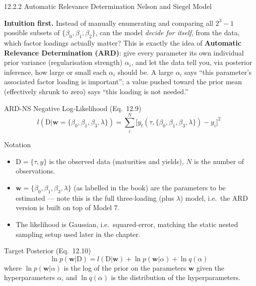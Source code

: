 \documentclass[aspectratio=169,10pt]{beamer}
\newcommand{\bw}{\mathbf{w}}
\newcommand{\D}{\mathrm{D}}
\begin{document}
\begin{frame}[allowframebreaks]{12.2.2 Automatic Relevance Determination Nelson and Siegel Model}

\textbf{Intuition first.} Instead of manually enumerating and comparing all $2^3-1$ possible subsets of $\{\beta_0,\beta_1,\beta_2\}$, can the model \emph{decide for itself}, from the data, which factor loadings actually matter? This is exactly the idea of \textbf{Automatic Relevance Determination (ARD)}: give every parameter its own individual prior variance (regularisation strength) $\alpha_i$, and let the data tell you, via posterior inference, how large or small each $\alpha_i$ should be. A large $\alpha_i$ says ``this parameter's associated factor loading is important''; a value pushed toward the prior mean (effectively shrunk to zero) says ``this loading is not needed.''

\begin{block}{ARD-NS Negative Log-Likelihood (Eq.~12.9)}
\[
  l(\D|\bw=\{\beta_0,\beta_1,\beta_3,\lambda\}) = \sum_{i}^{N}\big[y_t(\tau,\{\beta_0,\beta_1,\beta_3,\lambda\}) - y_i\big]^2
\]
\end{block}

\begin{block}{Notation}
\begin{itemize}
  \item $\D=\{\tau,y\}$ is the observed data (maturities and yields), $N$ is the number of observations.
  \item $\bw = \{\beta_0,\beta_1,\beta_3,\lambda\}$ (as labelled in the book) are the parameters to be estimated --- note this is the full three-loading (plus $\lambda$) model, i.e.\ the ARD version is built on top of Model 7.
  \item The likelihood is Gaussian, i.e.\ squared-error, matching the static nested sampling setup used later in the chapter.
\end{itemize}
\end{block}

\begin{block}{Target Posterior (Eq.~12.10)}
\[
  \ln p(\bw|\D) = l(\D|\bw) + \ln p(\bw|\alpha) + \ln q(\alpha)
\]
where $\ln p(\bw|\alpha)$ is the log of the prior on the parameters $\bw$ given the hyperparameters $\alpha$, and $\ln q(\alpha)$ is the distribution of the hyperparameters.
\end{block}

\framebreak


\end{frame}
\end{document}
